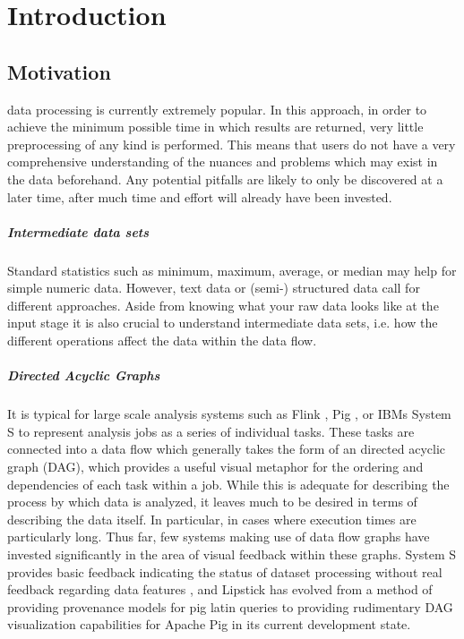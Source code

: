 \chapter{Introduction}
\label{sec:Introduction}



\section{Motivation}
 data processing is currently extremely popular. In this approach, in order to achieve the minimum possible time in which results are returned, very little preprocessing of any kind is performed. This means that users do not have a very comprehensive understanding of the nuances and problems which may exist in the data beforehand. Any potential pitfalls are likely to only be discovered at a later time, after much time and effort will already have been invested.

\paragraph{Intermediate data sets}
Standard statistics such as minimum, maximum, average, or median may help for simple numeric data. However, text data or (semi-) structured data call for different approaches. Aside from knowing what your raw data looks like at the input stage it is also crucial to understand intermediate data sets, i.e. how the different operations affect the data within the data flow.

\paragraph{Directed Acyclic Graphs}
It is typical for large scale analysis systems such as Flink \cite{Battre2010}, Pig \cite{Gates2009}, or IBMs System S \cite{Gedik2008} to represent analysis jobs as a series of individual tasks. These tasks are connected into a data flow which generally takes the form of an directed acyclic graph (DAG), which provides a useful visual metaphor for the ordering and dependencies of each task within a job. While this is adequate for describing the process by which data is analyzed, it leaves much to be desired in terms of describing the data itself. In particular, in cases where execution times are particularly long. Thus far, few systems making use of data flow graphs have invested significantly in the area of visual feedback within these graphs. System S provides basic feedback indicating the status of dataset processing without real feedback regarding data features \cite{Pauw2010}, and Lipstick \cite{Amsterdamer2011} has evolved from a method of providing provenance models for pig latin queries to providing rudimentary DAG visualization capabilities for Apache Pig \cite{Gates2009} in its current development state.

